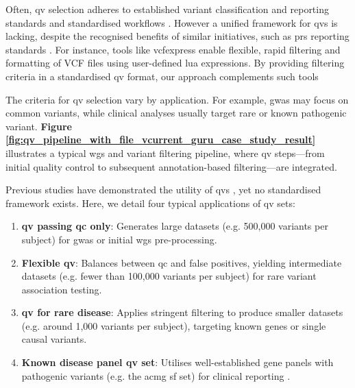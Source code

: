 Often, \ac{qv} selection adheres to established variant classification and reporting standards \cite{richards2015standards, li2017standards, li2017intervar, riggs2020technical, tavtigian2020fitting} and standardised workflows \cite{pedersen2021effective, anderson2010data, uffelmann2021genome}. 
However a unified framework for \ac{qv}s is lacking, despite the recognised benefits of similar initiatives, such as \ac{prs} reporting standards \cite{wand2021improving, lambert2021polygenic}.
For instance, tools like vcfexpress \cite{pedersen_vcfexpress_2025} enable flexible, rapid filtering and formatting of VCF files using user-defined lua expressions. By providing filtering criteria in a standardised \ac{qv} format, our approach complements such tools

The criteria for \ac{qv} selection vary by application. For example, \ac{gwas} may focus on common variants, while clinical analyses usually target rare or known pathogenic variant. 
\textbf{Figure \ref{fig:qv_pipeline_with_file_vcurrent_guru_case_study_result}}
illustrates a typical \ac{wgs} and variant filtering pipeline, where \ac{qv} steps—from initial quality control to subsequent annotation-based filtering—are integrated.

Previous studies have demonstrated the utility of \ac{qv}s \cite{povysil2019rare, cirulli2015exome}, yet no standardised framework exists. 
Here, we detail four typical applications of \ac{qv} sets:
\begin{enumerate}
    \item \textbf{\ac{qv} passing \ac{qc} only}: Generates large datasets (e.g. 500,000 variants per subject) for \ac{gwas} or initial \ac{wgs} pre-processing.
    \item \textbf{Flexible \ac{qv}}: Balances between \ac{qc} and false positives, yielding intermediate datasets (e.g. fewer than 100,000 variants per subject) for rare variant association testing.
    \item \textbf{\ac{qv} for rare disease}: Applies stringent filtering to produce smaller datasets (e.g. around 1,000 variants per subject), targeting known genes or single causal variants.
    \item \textbf{Known disease panel \ac{qv} set}: Utilises well-established gene panels with pathogenic variants (e.g. the \ac{acmg} \ac{sf} set) for clinical reporting \cite{miller2023acmg}.
\end{enumerate}

